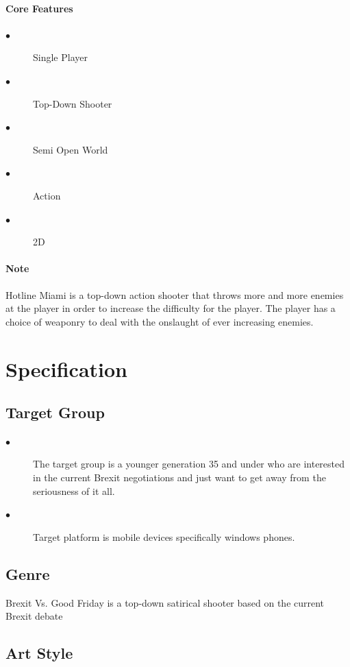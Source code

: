 \documentclass[a4paper]{scrreprt}
\begin{document}
\subsubsection{Core Features}
\begin{description}
\item[$\bullet$] Single Player
\item[$\bullet$] Top-Down Shooter
\item[$\bullet$] Semi Open World
\item[$\bullet$] Action
\item[$\bullet$] 2D
\end{description}

\subsubsection{Note}
Hotline Miami is a top-down action shooter that throws more and more enemies at the player in order to increase the difficulty for the player. 
The player has a choice of weaponry to deal with the onslaught of ever increasing enemies.    

\chapter{Specification}

\section{Target Group}

\begin{description}
\item[$\bullet$] The target group is a younger generation 35 and under who are interested in the current Brexit negotiations and just want to get away from the seriousness of it all.
\item[$\bullet$] Target platform is mobile devices specifically windows phones.
\end{description}

\section{Genre}
Brexit Vs. Good Friday is a top-down satirical shooter based on the current Brexit debate

\section{Art Style}
\end{document}
